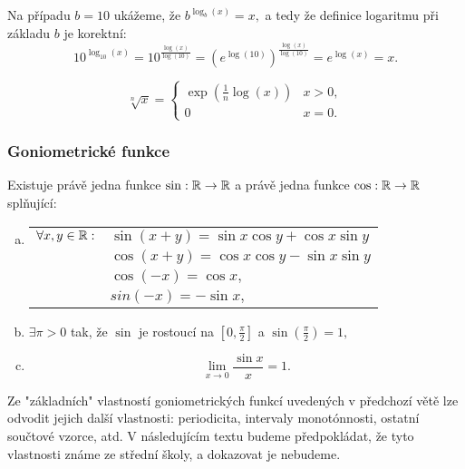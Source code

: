 \begin{remark}
    Na případu $b = 10$ ukážeme, že $b^{\log_b(x)} = x,$ a tedy že definice 
    logaritmu při základu $b$ je korektní:
    $$10^{\log_{10}(x)} = 10^{\frac{\log(x)}{\log(10)}} = 
    (e^{\log(10)})^{\frac{\log(x)}{\log(10)}} = e^{\log(x)} = x.$$
\end{remark}

\begin{remark}
    $$\sqrt[n] x = \begin{cases}
        \exp\left(\frac{1}{n}\log(x)\right) &x>0, \\
        0 &x = 0.
    \end{cases}$$
\end{remark}

\subsubsection{Goniometrické funkce}
\begin{theorem}
    \label{th:goniom}
    Existuje právě jedna funkce $\sin:\mathbb{R} \rightarrow \mathbb{R}$ a právě jedna
    funkce $\cos:\mathbb{R} \rightarrow \mathbb{R}$ splňující:
    \begin{enumerate}[a)]
        \item \begin{tabular}[t]{ll}
                $\forall x,y \in \mathbb{R}:$
                &$\sin(x +y) = \sin x \cos y + \cos x \sin y$ \\
                &$\cos(x + y) = \cos x \cos y - \sin x \sin y$ \\
                &$\cos(-x) = \cos x,$ \\
                &$sin(-x) = -\sin x,$
            \end{tabular}
        \item $\exists \pi > 0$ tak, že $\sin$ je rostoucí na $[0, \frac{\pi}{2}]$
            a $\sin(\frac{\pi}{2}) = 1,$
        \item $$\lim_{x \to 0} \frac{\sin x}{x} = 1.$$
    \end{enumerate}
\end{theorem}

\begin{remark}
    Ze "základních" vlastností goniometrických funkcí uvedených v předchozí 
    větě lze odvodit jejich další vlastnosti: periodicita, intervaly monotónnosti, 
    ostatní součtové vzorce, atd. V následujícím textu budeme předpokládat,
    že tyto vlastnosti známe ze střední školy, a dokazovat je nebudeme.
\end{remark}


